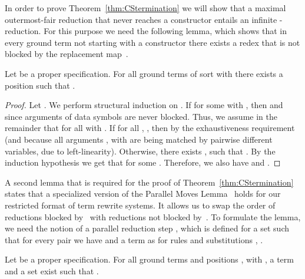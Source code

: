 \documentclass{eptcs}
\begin{document}
In order to prove Theorem~\ref{thm:CStermination} we will show that a maximal
outermost-fair reduction that never reaches a constructor entails an infinite
-reduction.
For this purpose we need the following lemma,
which shows that in every ground term not starting with a constructor there
exists a redex that is not blocked by the replacement map~.

\begin{lemma}
\label{lem:ExistRedex}
Let  be a proper specification.
For all ground terms  of sort  with  there exists a
position  such that .
\end{lemma}

\begin{proof}
Let . We perform structural induction
on .
If  for some  with , then
 and  since arguments of data symbols are
never blocked.
Thus, we assume in the remainder that
 for all  with .
If  for all , , then
 by the exhaustiveness requirement (and because all arguments
,  with  are being matched by pairwise different
variables, due to left-linearity).
Otherwise, there exists ,  such that
. By the induction hypothesis we get that 
for some . Therefore, we also have
 and .
\end{proof}


A second lemma that is required for the proof of Theorem~\ref{thm:CStermination}
states that a specialized version of the
Parallel Moves Lemma~\cite[Lemma~6.4.4]{BN98}
holds for our restricted format of term rewrite systems.
It allows us to swap the order of reductions blocked by~ with reductions
not blocked by~.
To formulate the lemma, we need the notion of a parallel reduction step
, which is defined for a set
 such that for every pair
 we have 
and a term
 as
 for rules
 and substitutions ,
.

\begin{lemma}
\label{lem:SpecialPML}
Let  be a proper specification.
For all ground terms  and positions ,
 with ,
a term  and a set  exist such that
.
\end{lemma}
\end{document}
